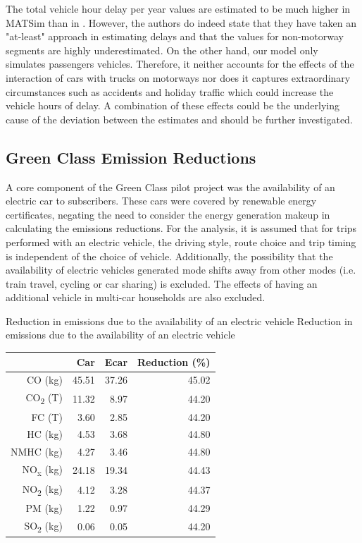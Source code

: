 The total vehicle hour delay per year values are estimated to be much higher in MATSim than in \citet{mkinfras2016staukosten}.
However, the authors do indeed state that they have taken an "at-least" approach in estimating delays and that the values for non-motorway segments are highly underestimated.
On the other hand, our model only simulates passengers vehicles.
Therefore, it neither accounts for the effects of the interaction of cars with trucks on motorways nor does it captures extraordinary circumstances such as accidents and holiday traffic which could increase the vehicle hours of delay.
A combination of these effects could be the underlying cause of the deviation between the estimates and should be further investigated.


\subsection{Green Class Emission Reductions}
A core component of the Green Class pilot project was the availability of an electric car to subscribers. These cars were covered by renewable energy certificates, negating the need to consider the energy generation makeup in calculating the emissions reductions. For the analysis, it is assumed that for trips performed with an electric vehicle, the driving style, route choice and trip timing is independent of the choice of vehicle. Additionally, the possibility that the availability of electric vehicles generated mode shifts away from other modes (i.e. train travel, cycling or car sharing) is excluded. 
The effects of having an additional vehicle in multi-car households are also excluded. 

\createtable%
{Reduction in emissions due to the availability of an electric vehicle}%
{Reduction in emissions due to the availability of an electric vehicle}%
{\label{tab:reduction_summary}}%
{%
\begin{tabular}{rrrr}
  \hline
 & Car & Ecar & Reduction (\%) \\ 
  \hline
CO (kg) & 45.51 & 37.26 & 45.02 \\ 
  CO\textsubscript{2} (T) & 11.32 & 8.97 & 44.20 \\ 
  FC (T) & 3.60 & 2.85 & 44.20 \\ 
  HC (kg) & 4.53 & 3.68 & 44.80 \\ 
  NMHC (kg) & 4.27 & 3.46 & 44.80 \\ 
  NO\textsubscript{x} (kg) & 24.18 & 19.34 & 44.43 \\ 
  NO\textsubscript{2} (kg) & 4.12 & 3.28 & 44.37 \\ 
  PM (kg) & 1.22 & 0.97 & 44.29 \\ 
  SO\textsubscript{2} (kg) & 0.06 & 0.05 & 44.20 \\ 
   \hline
\end{tabular}
}%
{}

